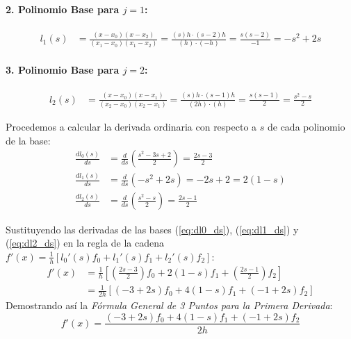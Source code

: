 \documentclass[11pt, a4paper]{article}
\begin{document}
	\paragraph{2. Polinomio Base para $j=1$:}
	\begin{align}
		l_1(s) &= \frac{(x - x_0)(x - x_2)}{(x_1 - x_0)(x_1 - x_2)} = \frac{(s)h \cdot (s - 2)h}{(h) \cdot (-h)} = \frac{s(s - 2)}{-1} = -s^2 + 2s
	\end{align}
	
	\paragraph{3. Polinomio Base para $j=2$:}
	\begin{align}
		l_2(s) &= \frac{(x - x_0)(x - x_1)}{(x_2 - x_0)(x_2 - x_1)} = \frac{(s)h \cdot (s - 1)h}{(2h) \cdot (h)} = \frac{s(s - 1)}{2} = \frac{s^2 - s}{2}
	\end{align}
	
	Procedemos a calcular la derivada ordinaria con respecto a $s$ de cada polinomio de la base:
	\begin{align}
		\frac{d l_0(s)}{ds} &= \frac{d}{ds} \left( \frac{s^2 - 3s + 2}{2} \right) = \frac{2s - 3}{2} \label{eq:dl0_ds} \\
		\frac{d l_1(s)}{ds} &= \frac{d}{ds} \left( -s^2 + 2s \right) = -2s + 2 = 2(1 - s) \label{eq:dl1_ds} \\
		\frac{d l_2(s)}{ds} &= \frac{d}{ds} \left( \frac{s^2 - s}{2} \right) = \frac{2s - 1}{2} \label{eq:dl2_ds}
	\end{align}
	
	Sustituyendo las derivadas de las bases (\ref{eq:dl0_ds}), (\ref{eq:dl1_ds}) y (\ref{eq:dl2_ds}) en la regla de la cadena $f'(x) = \frac{1}{h} \left[ l_0'(s) f_0 + l_1'(s) f_1 + l_2'(s) f_2 \right]$:
	\begin{align}
		f'(x) &= \frac{1}{h} \left[ \left( \frac{2s - 3}{2} \right) f_0 + 2(1 - s) f_1 + \left( \frac{2s - 1}{2} \right) f_2 \right] \nonumber \\
		&= \frac{1}{2h} \left[ (-3 + 2s) f_0 + 4(1 - s) f_1 + (-1 + 2s) f_2 \right]
	\end{align}
	Demostrando así la \textit{Fórmula General de 3 Puntos para la Primera Derivada}:
	\begin{equation}
		f'(x) = \frac{(-3 + 2s) f_0 + 4(1 - s) f_1 + (-1 + 2s) f_2}{2h}
		\label{eq:three_point_first_deriv}
	\end{equation}
	
\end{document}
